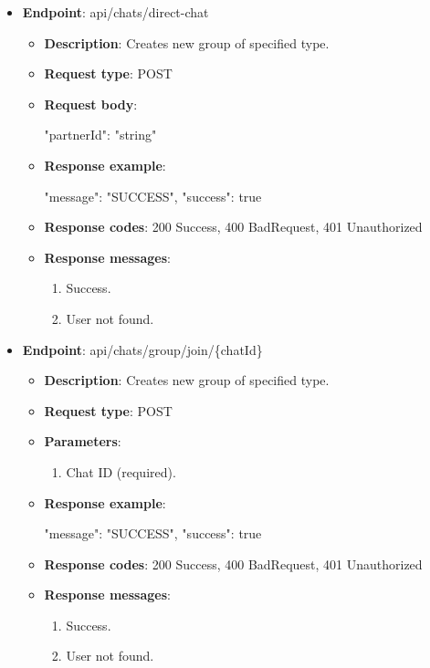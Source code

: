 \begin{itemize}
    \item \textbf{Endpoint}: api/chats/direct-chat
    \begin{itemize}
        \item \textbf{Description}: Creates new group of specified type.
        \item \textbf{Request type}: POST
        \item \textbf{Request body}:
        \begin{spverbatim}
        {
            "partnerId": "string"
        }
        \end{spverbatim}
        \item \textbf{Response example}:
        \begin{spverbatim}
        {
            "message": "SUCCESS",
            "success": true
        }
        \end{spverbatim}
        \item \textbf{Response codes}: 200 Success, 400 BadRequest, 401 Unauthorized
        \item \textbf{Response messages}:
        \begin{enumerate}
            \item Success.
            \item User not found.
        \end{enumerate}
    \end{itemize}

    \item \textbf{Endpoint}: api/chats/group/join/\{chatId\}
    \begin{itemize}
        \item \textbf{Description}: Creates new group of specified type.
        \item \textbf{Request type}: POST
        \item \textbf{Parameters}:
        \begin{enumerate}
            \item Chat ID (required).
        \end{enumerate}
        \item \textbf{Response example}:
        \begin{spverbatim}
        {
            "message": "SUCCESS",
            "success": true
        }
        \end{spverbatim}
        \item \textbf{Response codes}: 200 Success, 400 BadRequest, 401 Unauthorized
        \item \textbf{Response messages}:
        \begin{enumerate}
            \item Success.
            \item User not found.
        \end{enumerate}
    \end{itemize}
\end{itemize}

